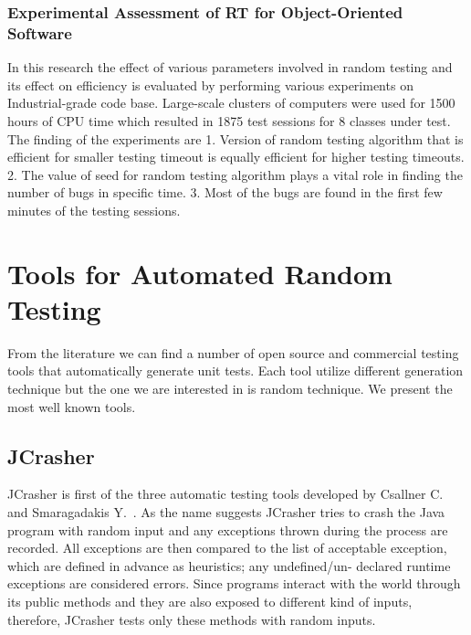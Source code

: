 {\subsubsection{Experimental Assessment of RT for Object-Oriented Software}
In this research the effect of various parameters involved in random testing and its effect on efficiency is evaluated by performing various experiments on Industrial-grade code base. Large-scale clusters of computers were used for 1500 hours of CPU time which resulted in 1875 test sessions for 8 classes under test.~\cite{Ciupa2007} The finding of the experiments are 1. Version of random testing algorithm that is efficient for smaller testing timeout is equally efficient for higher testing timeouts. 2. The value of seed for random testing algorithm plays a vital role in finding the number of bugs in specific time. 3. Most of the bugs are found in the first few minutes of the testing sessions.


\section{Tools for Automated Random Testing}
From the literature we can find a number of open source and commercial testing tools that automatically generate unit tests. Each tool utilize different generation technique but the one we are interested in is random technique. We present the most well known tools.


\subsection{JCrasher}

JCrasher is first of the three automatic testing tools developed by Csallner C. and Smaragadakis Y.~\cite{Pacheco2007b}. As the name suggests JCrasher tries to crash the Java program with random input and any exceptions thrown during the process are recorded. All exceptions are then compared to the list of acceptable exception, which are defined in advance as heuristics; any undefined/un- declared runtime exceptions are considered errors. Since programs interact with the world through its public methods and they are also exposed to different kind of inputs, therefore, JCrasher tests only these methods with random inputs.

}
